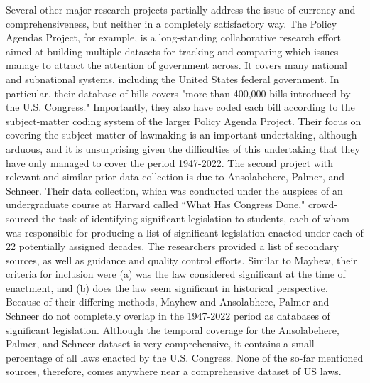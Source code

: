 \documentclass[fleqn,10pt]{wlscirep}
\begin{document}
Several other major research projects partially address the issue of currency and comprehensiveness, but neither in a completely satisfactory way. The Policy Agendas Project, for example, is a long-standing collaborative research effort aimed at building multiple datasets for tracking and comparing which issues manage to attract the attention of government across. It covers many national and subnational systems, including the United States federal government. In particular, their database of bills covers "more than 400,000 bills introduced by the U.S. Congress." Importantly, they also have coded each bill according to the subject-matter coding system of the larger Policy Agenda Project. Their focus on covering the subject matter of lawmaking is an important undertaking, although arduous, and it is unsurprising given the difficulties of this undertaking that they have only managed to cover the period 1947-2022. The second project with relevant and similar prior data collection is due to Ansolabehere, Palmer, and Schneer.\cite{ansolabehere_palmer_schneer_2016,ansolabehere2018divided} Their data collection, which was conducted under the auspices of an undergraduate course at Harvard called ``What Has Congress Done," crowd-sourced the task of identifying significant legislation to students, each of whom was responsible for producing a list of significant legislation enacted under each of 22 potentially assigned decades. The researchers provided a list of secondary sources, as well as guidance and quality control efforts. Similar to Mayhew, their criteria for inclusion were (a) was the law considered significant at the time of enactment, and (b) does the law seem significant in historical perspective. Because of their differing methods, Mayhew and Ansolabhere, Palmer and Schneer do not completely overlap in the 1947-2022 period as databases of significant legislation. Although the temporal coverage for the Ansolabehere, Palmer, and Schneer dataset is very comprehensive, it contains a small percentage of all laws enacted by the U.S. Congress. None of the so-far mentioned sources, therefore, comes anywhere near a comprehensive dataset of US laws. 


\end{document}
